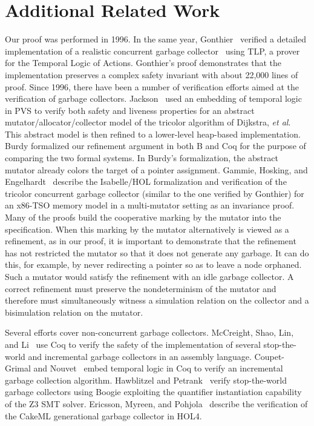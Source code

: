 
\section{Additional Related Work}
\label{sec:related-work}

Our proof was performed in 1996.  In the same year, 
Gonthier~\cite{gonthier1996verifying}
verified a detailed 
implementation of a realistic concurrent garbage collector~\cite{doligez1994portable} using TLP, a prover
for the Temporal Logic of Actions.  Gonthier's proof demonstrates 
that the implementation preserves a complex safety invariant 
with about 22,000 lines of proof.  Since 1996, there have been a
number of
verification efforts aimed at the verification of garbage collectors.
Jackson~\cite{jackson1998verifying} used an embedding of temporal logic in PVS to verify both
safety and liveness properties for an abstract
mutator/allocator/collector model of the tricolor algorithm of
Dijkstra, \emph{et al}.  This abstract model is then
refined to a lower-level heap-based implementation.  Burdy \cite{burd01} formalized
our refinement argument in both B and Coq for the purpose of comparing
the
two formal systems.  In Burdy's formalization, the abstract mutator
already colors the target of a pointer assignment.
Gammie, Hosking,
and Engelhardt~\cite{gammie2015relaxing} describe the Isabelle/HOL
formalization and verification of
the tricolor concurrent garbage 
collector (similar to the one verified by Gonthier) for an x86-TSO
memory model in a multi-mutator setting as an invariance proof.
Many of the proofs build the cooperative marking by the mutator
into the specification.  When this marking 
by the mutator alternatively
is viewed as a refinement,
as in our proof,
it
is important to demonstrate that the refinement has not restricted the
mutator so that it does not generate any garbage.  It can do this, for
example,
by never redirecting a pointer so as to leave a node orphaned.
Such a
mutator
would satisfy the refinement with an idle garbage collector.  A
correct
refinement must preserve the nondeterminism of the mutator and
therefore must simultaneously witness a simulation relation on the
collector and a bisimulation
relation on the mutator.  

Several efforts cover non-concurrent garbage collectors.  McCreight,
Shao, Lin, and Li~\cite{mccreight2007general} use Coq to
verify the safety of the implementation of several
stop-the-world and incremental garbage collectors in an assembly
language.  Coupet-Grimal and Nouvet~\cite{8133460} embed temporal
logic in Coq to verify an incremental garbage collection algorithm.
Hawblitzel and Petrank~\cite{hawblitzel2009automated} verify stop-the-world garbage collectors using
Boogie exploiting the quantifier instantiation capability of the Z3
SMT solver. Ericsson, Myreen, and Pohjola~\cite{ericsson2017verified}
describe the verification of
the CakeML generational garbage collector in HOL4.



